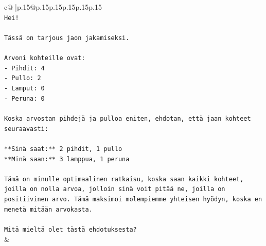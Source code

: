 \documentclass{article}
\begin{document}
{\begin{supertabular}{c@{$\;$}|p{.15\linewidth}@{}p{.15\linewidth}p{.15\linewidth}p{.15\linewidth}p{.15\linewidth}p{.15\linewidth}}
{{{\\ 
\texttt{Hei!} \\
\\ 
\texttt{Tässä on tarjous jaon jakamiseksi.} \\
\\ 
\texttt{Arvoni kohteille ovat:} \\
\texttt{{-} Pihdit: 4} \\
\texttt{{-} Pullo: 2} \\
\texttt{{-} Lamput: 0} \\
\texttt{{-} Peruna: 0} \\
\\ 
\texttt{Koska arvostan pihdejä ja pulloa eniten, ehdotan, että jaan kohteet seuraavasti:} \\
\\ 
\texttt{**Sinä saat:** 2 pihdit, 1 pullo} \\
\texttt{**Minä saan:** 3 lamppua, 1 peruna} \\
\\ 
\texttt{Tämä on minulle optimaalinen ratkaisu, koska saan kaikki kohteet, joilla on nolla arvoa, jolloin sinä voit pitää ne, joilla on positiivinen arvo. Tämä maksimoi molempiemme yhteisen hyödyn, koska en menetä mitään arvokasta.} \\
\\ 
\texttt{Mitä mieltä olet tästä ehdotuksesta?} \\
            }
        }
    }
    & \\ \\


\end{supertabular}}
\end{document}

